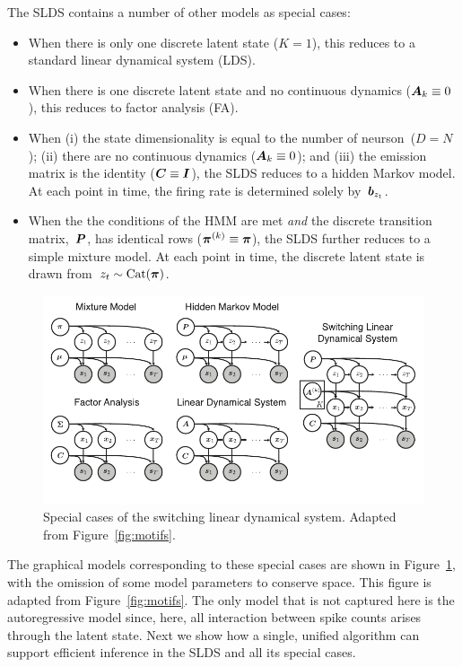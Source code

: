 The SLDS contains a number of other models as special cases:
\begin{itemize}
\item When there is only one discrete latent state ($K=1$), this
  reduces to a standard linear dynamical system (LDS).
  
\item When there is one discrete latent state and no continuous dynamics
  (${\boldsymbol{A}_k \equiv 0}$), this reduces to factor analysis (FA).

\item When (i) the state dimensionality is equal to the number of
  neurson~($D=N$); (ii) there are no continuous dynamics (${\boldsymbol{A}_k
    \equiv 0}$); and (iii) the emission matrix is the identity (${\boldsymbol{C}
    \equiv \boldsymbol{I}}$), the SLDS reduces to a hidden Markov model. At each
  point in time, the firing rate is determined solely
  by~$\boldsymbol{b}_{z_t}$.

\item When the the conditions of the HMM are met \emph{and} the
  discrete transition matrix,~$\boldsymbol{P}$, has identical rows (${\boldsymbol{\pi}^{(k)}
    \equiv \boldsymbol{\pi}}$), the SLDS further reduces to a simple mixture
  model. At each point in time, the discrete latent state is drawn
  from~${z_t \sim \mathrm{Cat}(\boldsymbol{\pi})}$.
\end{itemize}

\begin{figure}[t]
  \centering%
\includegraphics[width=5.5in]{figures/ch8/graphical_models} 
\vspace{-.25in}
\caption{Special cases of the switching linear dynamical system.
  Adapted from Figure~\ref{fig:motifs}.}
\label{fig:slds_models}
\end{figure}

The graphical models corresponding to these special cases are shown in
Figure~\ref{fig:slds_models}, with the omission of some model
parameters to conserve space. This figure is adapted from
Figure~\ref{fig:motifs}. The only model that is not captured here
is the autoregressive model since, here, all interaction between
spike counts arises through the latent state. Next we show how
a single, unified algorithm can support efficient
inference in the SLDS and all its special cases.


